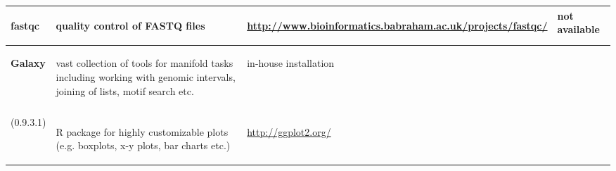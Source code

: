 \begin{singlespacing}
\begin{small}
\begin{longtable}{>{\textsf\bgroup\raggedleft\arraybackslash}p{2.7cm}<{\egroup} >{\textsf\bgroup}p{4.5cm}<{\egroup} >{\textsf\bgroup}p{4.2cm}<{\egroup}>{\textsf\bgroup}p{2.3cm}<{\egroup}}
 \begin{minipage}{2.7cm}
				\textbf{fastqc}
				\end{minipage}
			&  \begin{minipage}{4.5cm}
				quality control of FASTQ files
			\end{minipage} 
			&  \begin{minipage}{4.2cm}
				\url{http://www.bioinformatics.babraham.ac.uk/projects/fastqc/}
			\end{minipage} 
			&  not available
\tabularnewline \midrule
 \begin{minipage}{2.7cm}
				\textbf{Galaxy} %
				\end{minipage} 
			&  \begin{minipage}{4.5cm}
				vast collection of tools for manifold tasks including working with genomic intervals, joining of lists, motif search etc. %
			\end{minipage} 
			&  \begin{minipage}{4.2cm}
				in-house installation %
			\end{minipage} 
					&  \begin{minipage}{2.3cm}
		\citet{Goecks2010} %
			\end{minipage} 
\tabularnewline \midrule
 \begin{minipage}{2.7cm}
					\textbf{ggplot2}\\
					(0.9.3.1)
			\end{minipage} 
			&  \begin{minipage}{4.5cm}
				R package for highly customizable plots (e.g. boxplots, x-y plots, bar charts etc.)
			\end{minipage} 
			&  \begin{minipage}{4.2cm}
				\url{http://ggplot2.org/}
			\end{minipage} 
			&  \begin{minipage}{2.3cm}
		\citet{ggplot2}
			\end{minipage} 

\end{longtable}
\end{small}
\end{singlespacing}
